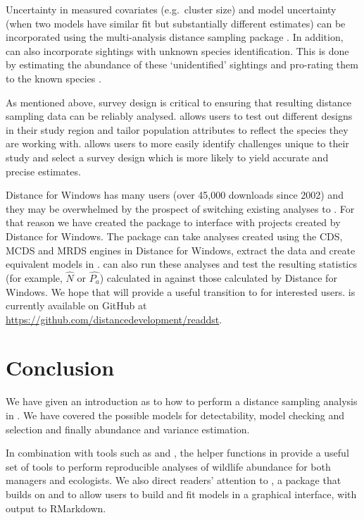 \documentclass[article]{jss}
\begin{document}
Uncertainty in measured covariates (e.g.~cluster size) and model
uncertainty (when two models have similar fit but substantially
different estimates) can be incorporated using the multi-analysis
distance sampling package  \citep{mads-pkg}. In addition,
 can also incorporate sightings with unknown species
identification. This is done by estimating the abundance of these
`unidentified' sightings and pro-rating them to the known species
\citep{Gerrodette:2005}.

As mentioned above, survey design is critical to ensuring that resulting
distance sampling data can be reliably analysed.  allows
users to test out different designs in their study region and tailor
population attributes to reflect the species they are working with.
 \citep{DSsim-pkg} allows users to more easily identify
challenges unique to their study and select a survey design which is
more likely to yield accurate and precise estimates.

Distance for Windows has many users (over 45,000 downloads since 2002)
and they may be overwhelmed by the prospect of switching existing
analyses to . For that reason we have created the
 \citep{readdst-pkg} package to interface with projects
created by Distance for Windows. The package can take analyses created
using the CDS, MCDS and MRDS engines in Distance for Windows, extract
the data and create equivalent models in .  can
also run these analyses and test the resulting statistics (for example,
\(\hat{N}\) or \(\hat{P_a}\)) calculated in  against those
calculated by Distance for Windows. We hope that  will
provide a useful transition to  for interested users.
 is currently available on GitHub at
\url{https://github.com/distancedevelopment/readdst}.

\section{Conclusion}\label{conclusion}

We have given an introduction as to how to perform a distance sampling
analysis in . We have covered the possible models for
detectability, model checking and selection and finally abundance and
variance estimation.

In combination with tools such as  and 
\citep{rmarkdown-pkg}, the helper functions in  provide a
useful set of tools to perform reproducible analyses of wildlife
abundance for both managers and ecologists. We also direct readers'
attention to  \citep{dsshiny-pkg}, a package that builds on
 \citep{shiny-pkg} and  to allow users to build and
fit models in a graphical interface, with output to RMarkdown.
\end{document}
